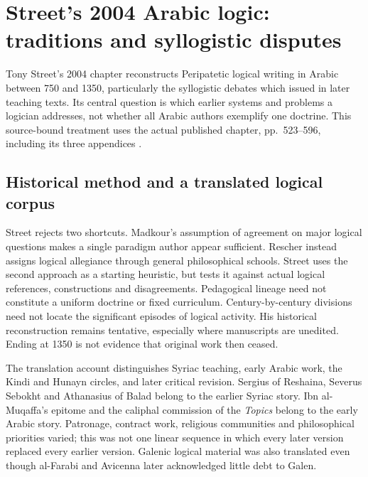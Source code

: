 \chapter{Street's 2004 Arabic logic: traditions and syllogistic disputes}
\label{sec:p13-street-arabic-logic-2004}

Tony Street's 2004 chapter reconstructs Peripatetic logical writing
in Arabic between 750 and 1350, particularly the syllogistic debates
which issued in later teaching texts. Its central question is which
earlier systems and problems a logician addresses, not whether all
Arabic authors exemplify one doctrine. This source-bound treatment
uses the actual published chapter, pp.~523--596, including its
three appendices \cite{Street2004ArabicLogicHHL}.

\section{Historical method and a translated logical corpus}
\label{sec:p13-street-2004-method-corpus}

Street rejects two shortcuts. Madkour's assumption of agreement
on major logical questions makes a single paradigm author appear
sufficient. Rescher instead assigns logical allegiance through
general philosophical schools. Street uses the second approach
as a starting heuristic, but tests it against actual logical
references, constructions and disagreements. Pedagogical lineage
need not constitute a uniform doctrine or fixed curriculum.
Century-by-century divisions need not locate the significant
episodes of logical activity. His historical reconstruction
remains tentative, especially where manuscripts are unedited.
Ending at 1350 is not evidence that original work then ceased.
\cite[pp.~523--529]{Street2004ArabicLogicHHL}

The translation account distinguishes Syriac teaching, early
Arabic work, the Kindi and Hunayn circles, and later critical
revision. Sergius of Reshaina, Severus Sebokht and Athanasius
of Balad belong to the earlier Syriac story. Ibn al-Muqaffa's
epitome and the caliphal commission of the \emph{Topics} belong
to the early Arabic story. Patronage, contract work, religious
communities and philosophical priorities varied; this was not
one linear sequence in which every later version replaced
every earlier version. Galenic logical material was also
translated even though al-Farabi and Avicenna later acknowledged
little debt to Galen.
\cite[pp.~529--532]{Street2004ArabicLogicHHL}

